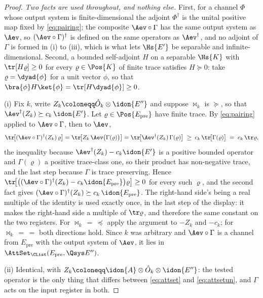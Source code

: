 \begin{proof}
\emph{Two facts are used throughout, and nothing else.} First, for a channel
$\Phi$ whose output system is finite-dimensional the adjoint $\Phi^{\dagger}$
is the unital positive map fixed by \eqref{eq:pairing}; the composite
$\Aev\circ\Gamma$ has the same output system as $\Aev$, so
$(\Aev\circ\Gamma)^{\dagger}$ is defined on the same operators as
$\Aev^{\dagger}$, and no adjoint of $\Gamma$ is formed in (i) to (iii), which
is what lets $\Hs{E'}$ be separable and infinite-dimensional. Second, a
bounded self-adjoint $H$ on a separable $\Hs{K}$ with $\tr[H\varrho]\ge0$ for
every $\varrho\in\Pos{K}$ of finite trace satisfies $H\succeq0$: take
$\varrho=\dyad{\phi}$ for a unit vector $\phi$, so that
$\bra{\phi}H\ket{\phi}=\tr[H\dyad{\phi}]\ge0$.

(i) Fix $k$, write $Z_k\coloneqq\hat O_k\otimes\idon{E''}$ and suppose
$\bowtie_k$ is $\succeq$, so that $\Aev^{\dagger}(Z_k)\succeq c_k\,\idon{E'}$.
Let $\varrho\in\Pos{E_{\mathrm{pre}}}$ have finite trace. By
\eqref{eq:pairing} applied to $\Aev\circ\Gamma$, then to $\Aev$,
\begin{equation*}
  \tr\!\big[(\Aev\circ\Gamma)^{\dagger}(Z_k)\,\varrho\big]
  =\tr\!\big[Z_k\,\Aev\big(\Gamma(\varrho)\big)\big]
  =\tr\!\big[\Aev^{\dagger}(Z_k)\,\Gamma(\varrho)\big]
  \;\ge\;c_k\,\tr\!\big[\Gamma(\varrho)\big]
  \;=\;c_k\,\tr\varrho ,
\end{equation*}
the inequality because $\Aev^{\dagger}(Z_k)-c_k\idon{E'}$ is a positive bounded
operator and $\Gamma(\varrho)$ a positive trace-class one, so their product has
non-negative trace, and the last step because $\Gamma$ is trace preserving.
Hence $\tr\!\big[\big((\Aev\circ\Gamma)^{\dagger}(Z_k)
-c_k\idon{E_{\mathrm{pre}}}\big)\varrho\big]\ge0$ for every such $\varrho$, and
the second fact gives
$(\Aev\circ\Gamma)^{\dagger}(Z_k)\succeq c_k\,\idon{E_{\mathrm{pre}}}$.
The right-hand side's being a real multiple of the identity is used exactly
once, in the last step of the display: it makes the right-hand side a
multiple of $\tr\varrho$, and therefore the same constant on the two
registers. For $\bowtie_k\,=\,\preceq$ apply the argument to $-Z_k$ and
$-c_k$; for $\bowtie_k\,=\,=$ both directions hold. Since $k$ was arbitrary and
$\Aev\circ\Gamma$ is a channel from $E_{\mathrm{pre}}$ with the output system of
$\Aev$, it lies in $\AttSet_{\CList}(E_{\mathrm{pre}},\Qsys E'')$.

(ii) Identical, with $Z_k\coloneqq\idon{A}\otimes\hat O_k\otimes\idon{E''}$:
the tested operator is the only thing that differs between \eqref{eq:attset}
and \eqref{eq:attsetun}, and $\Gamma$ acts on the input register in both.


\end{proof}
